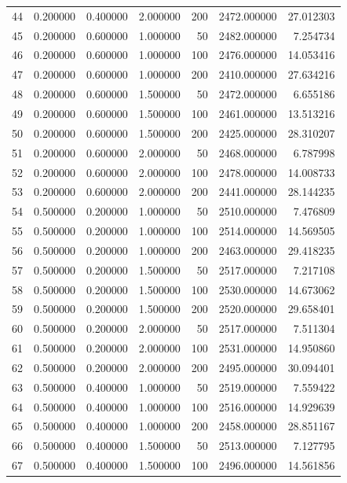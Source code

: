 \begin{longtable}{lrrrrrr}
44 & 0.200000 & 0.400000 & 2.000000 & 200 & 2472.000000 & 27.012303 \\
45 & 0.200000 & 0.600000 & 1.000000 & 50 & 2482.000000 & 7.254734 \\
46 & 0.200000 & 0.600000 & 1.000000 & 100 & 2476.000000 & 14.053416 \\
47 & 0.200000 & 0.600000 & 1.000000 & 200 & 2410.000000 & 27.634216 \\
48 & 0.200000 & 0.600000 & 1.500000 & 50 & 2472.000000 & 6.655186 \\
49 & 0.200000 & 0.600000 & 1.500000 & 100 & 2461.000000 & 13.513216 \\
50 & 0.200000 & 0.600000 & 1.500000 & 200 & 2425.000000 & 28.310207 \\
51 & 0.200000 & 0.600000 & 2.000000 & 50 & 2468.000000 & 6.787998 \\
52 & 0.200000 & 0.600000 & 2.000000 & 100 & 2478.000000 & 14.008733 \\
53 & 0.200000 & 0.600000 & 2.000000 & 200 & 2441.000000 & 28.144235 \\
54 & 0.500000 & 0.200000 & 1.000000 & 50 & 2510.000000 & 7.476809 \\
55 & 0.500000 & 0.200000 & 1.000000 & 100 & 2514.000000 & 14.569505 \\
56 & 0.500000 & 0.200000 & 1.000000 & 200 & 2463.000000 & 29.418235 \\
57 & 0.500000 & 0.200000 & 1.500000 & 50 & 2517.000000 & 7.217108 \\
58 & 0.500000 & 0.200000 & 1.500000 & 100 & 2530.000000 & 14.673062 \\
59 & 0.500000 & 0.200000 & 1.500000 & 200 & 2520.000000 & 29.658401 \\
60 & 0.500000 & 0.200000 & 2.000000 & 50 & 2517.000000 & 7.511304 \\
61 & 0.500000 & 0.200000 & 2.000000 & 100 & 2531.000000 & 14.950860 \\
62 & 0.500000 & 0.200000 & 2.000000 & 200 & 2495.000000 & 30.094401 \\
63 & 0.500000 & 0.400000 & 1.000000 & 50 & 2519.000000 & 7.559422 \\
64 & 0.500000 & 0.400000 & 1.000000 & 100 & 2516.000000 & 14.929639 \\
65 & 0.500000 & 0.400000 & 1.000000 & 200 & 2458.000000 & 28.851167 \\
66 & 0.500000 & 0.400000 & 1.500000 & 50 & 2513.000000 & 7.127795 \\
67 & 0.500000 & 0.400000 & 1.500000 & 100 & 2496.000000 & 14.561856 \\

\end{longtable}
